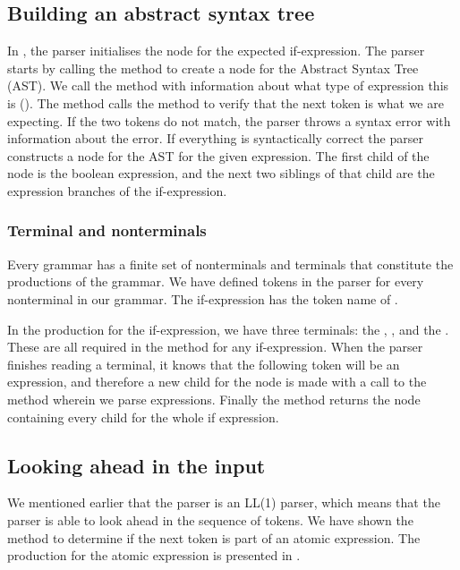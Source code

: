 \subsection{Building an abstract syntax tree}
In , the parser initialises the node for the
expected if-expression. The parser starts by calling the method
 to create a node for the Abstract Syntax Tree (AST).
We call the method with information about what type of expression this
is (). The method calls the  method
to verify that the next token is what we are expecting. If the two
tokens do not match, the parser throws a syntax error with information
about the error. If everything is syntactically correct the parser
constructs a node for the AST for the given expression. The first child
of the node is the boolean expression, and the next two siblings of that
child are the expression branches of the if-expression.

\subsubsection{Terminal and nonterminals}
Every grammar has a finite set of nonterminals and terminals that
constitute the productions of the grammar. We have defined tokens in the
parser for every nonterminal in our grammar. The if-expression has the
token name of .

In the production for the if-expression, we have three terminals: the ,
, and the . These are all required in the method for any
if-expression. When the parser finishes reading a terminal, it knows that the
following token will be an expression, and therefore a new child for the node is
made with a call to the  method wherein we parse
expressions. Finally the method returns the node containing every child for the
whole if expression.

\subsection{Looking ahead in the input}
We mentioned earlier that the parser is an LL(1) parser, which means that the
parser is able to look ahead in the sequence of tokens. We have shown the
 method to determine if the next token is part of an
atomic expression. The production for the atomic expression is presented in
.

